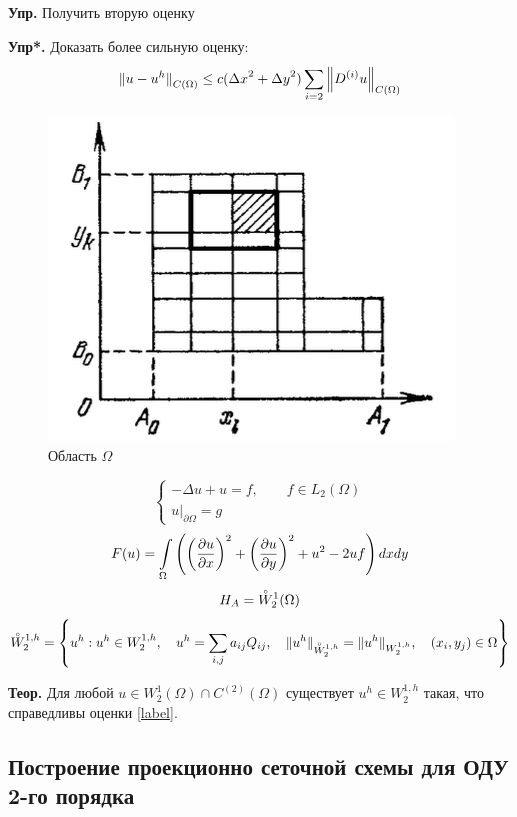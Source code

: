 \textbf{Упр.} Получить вторую оценку

\textbf{Упр*.} Доказать более сильную оценку:
\[ {\|u - u^h\|}_{C(\Omega)} \leq c ({\Delta x}^2 + {\Delta y}^2) \sum\limits_{i=2}^{} {\left\| D^{(i)} u \right\|}_{C (\Omega)}\]

\begin{figure}[h!]
	\begin{center}
		\includegraphics[scale=0.4]{images/12.png}
	\end{center}
	\label{12}
	\caption{Область $\Omega$}
\end{figure}

\[ \left\{
\begin{array}{l}
	- \Delta u + u = f, \qquad f \in L_2 (\Omega) \\
	u|_{\partial \Omega} = g
\end{array}
\right. \]
\[ F(u) = \int\limits_{\Omega} \left( {\left( \frac{\partial u}{\partial x} \right)}^2 + {\left( \frac{\partial u}{\partial y} \right)}^2 + u^2 - 2uf \right) dx dy \]
\[ H_A = \accentset{\circ}{W}_2^1 (\Omega) \]
\[ \accentset{\circ}{W}_2^{1,h} = \left\{ u^h: u^h \in W_2^{1,h}, \quad u^h = \sum\limits_{i,j} a_{ij} Q_{ij}, \quad {\| u^h \|}_{\accentset{\circ}{W}_2^{1,h}} = {\| u^h \|}_{W_2^{1,h}}, \quad (x_i, y_j) \in \Omega \right\} \]

\textbf{Теор.} Для любой $u \in W_2^1 (\Omega) \cap C^{(2)}(\Omega)$ существует $u^h \in W_2^{1, h}$ такая, что справедливы оценки \eqref{label}.

\subsection{Построение проекционно сеточной схемы для ОДУ 2-го порядка}

